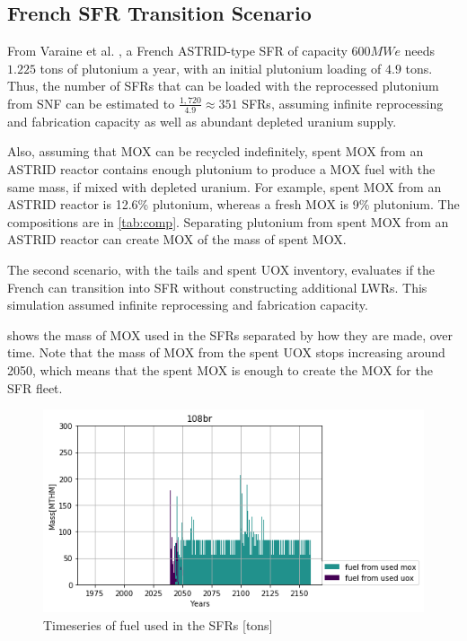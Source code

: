 \subsection{French \gls{SFR} Transition Scenario}

From Varaine et al. \cite{marsaultmarie-sophie_pre-conceptual_2012}, a French
ASTRID-type \gls{SFR} of capacity $600 MWe$ needs $1.225$ tons of
plutonium a year, with an initial plutonium loading of $4.9$ tons. 
Thus, the number of \glspl{SFR} that can be loaded with the reprocessed
plutonium from \gls{SNF} can be estimated to $\frac{1,720}{4.9} \approx 351$ \glspl{SFR},
assuming infinite reprocessing and fabrication capacity as well as
abundant depleted uranium supply.

Also, assuming that \gls{MOX} can be recycled indefinitely,
spent \gls{MOX} from an ASTRID reactor
contains enough plutonium to produce a \gls{MOX} fuel with
the same mass, if mixed with depleted uranium. For example,
spent \gls{MOX} from an ASTRID reactor is 12.6\% plutonium,
whereas a fresh \gls{MOX} is 9\% plutonium.
The compositions are in \cref{tab:comp}.
Separating plutonium from spent \gls{MOX} from
an ASTRID reactor can create \gls{MOX} of the mass of spent \gls{MOX}.

The second scenario, with the tails and spent \gls{UOX}
inventory, evaluates if the French can transition into \gls{SFR}
without constructing additional \gls{LWR}s. This simulation
assumed infinite reprocessing and fabrication capacity.

 shows the mass of \gls{MOX} used in the 
\gls{SFR}s separated by how they are made, over time.
Note that the mass of \gls{MOX} from the spent \gls{UOX}
stops increasing around 2050, which means that the spent
\gls{MOX} is enough to create the \gls{MOX} for the
\gls{SFR} fleet. 

\begin{figure}[htbp!]
	\begin{center}
		\includegraphics[scale=0.7]{./images/french-transition/where_fuel.png}
	\end{center}
	\caption{Timeseries of fuel used in the \gls{SFR}s [tons]}
	\label{fig:fuel}
\end{figure}

